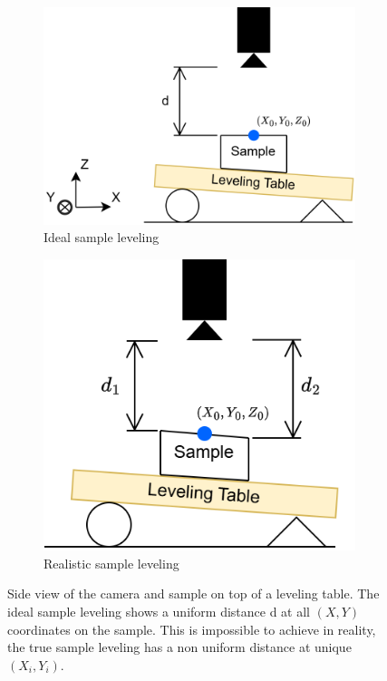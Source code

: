 \documentclass[a4paper,12pt]{article}
\begin{document}
\begin{figure}
    \centering
    \begin{subfigure}{.5\textwidth}
      \centering
      \includegraphics[height=0.5\linewidth]{../diagrams/sample_setup_ideal.png}
      \caption{Ideal sample leveling}
      \label{fig:ideal_levelling}
    \end{subfigure}%
    \begin{subfigure}{.5\textwidth}
      \centering
      \includegraphics[height=0.5\linewidth]{../diagrams/sample_setup_realistic.png}
      \caption{Realistic sample leveling}
      \label{fig:realistic_levelling}
    \end{subfigure}
    \caption{Side view of the camera and sample on top of a leveling table. The ideal sample leveling shows a uniform distance d at all $(X,Y)$ coordinates on the sample. This is impossible to achieve in reality, the true sample leveling has a non uniform distance at unique $(X_i, Y_i)$.}
    \label{fig:sample_levelling}
\end{figure}
\end{document}
